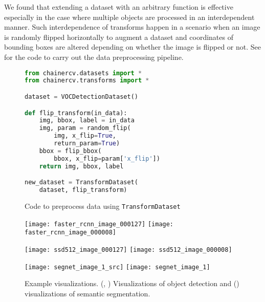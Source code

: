 \documentclass[sigconf]{acmart}
\begin{document}
We found that extending a dataset with an arbitrary function is effective especially in the case where multiple objects are processed in an interdependent manner.
Such interdependence of transforms happen in a scenario when an image is randomly flipped horizontally to augment a dataset and coordinates of bounding boxes are altered depending on whether the image is flipped or not. 
See  for the code to carry out the data preprocessing pipeline.
\begin{figure}
\begin{lstlisting}[language=Python]
from chainercv.datasets import *
from chainercv.transforms import *

dataset = VOCDetectionDataset()

def flip_transform(in_data):
    img, bbox, label = in_data
    img, param = random_flip(
        img, x_flip=True,
        return_param=True)
    bbox = flip_bbox(
        bbox, x_flip=param['x_flip'])
    return img, bbox, label

new_dataset = TransformDataset(
    dataset, flip_transform)
\end{lstlisting}
\caption{Code to preprocess data using {\tt TransformDataset}}
\label{fig:transform}
\end{figure}







\begin{figure*}[ht]
  \begin{minipage}{0.33\linewidth}
  	\centering
  	\texttt{[image: faster\_rcnn\_image\_000127]}
    \texttt{[image: faster\_rcnn\_image\_000008]}
  	\label{fig:vis_faster_rcnn}
  \end{minipage}
  \begin{minipage}{0.33\linewidth}
    \centering
  	\texttt{[image: ssd512\_image\_000127]}
   	\texttt{[image: ssd512\_image\_000008]}
	\label{fig:vis_ssd}
  \end{minipage}
  \begin{minipage}{0.33\linewidth}
    \centering
  	\texttt{[image: segnet\_image\_1\_src]}
    \texttt{[image: segnet\_image\_1]}
  	\label{fig:vis_segnet}
  \end{minipage}
  \caption{Example visualizations. (,  ) Visualizations of object detection and () visualizations of semantic segmentation.}
  \label{fig:vis_models}
\end{figure*}
\end{document}

